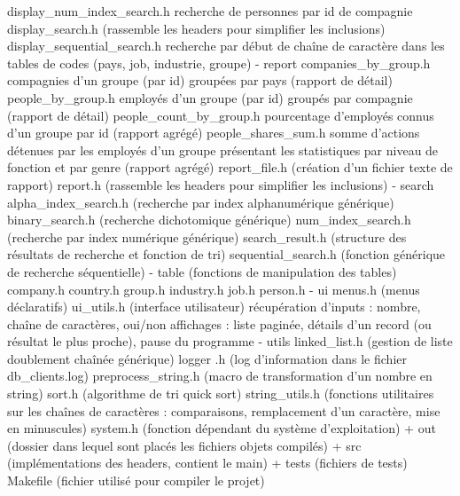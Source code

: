 \documentclass{article}
\begin{document}
\begin{verbatimtab}
            display_num_index_search.h
                recherche de personnes par id de compagnie
            display_search.h (rassemble les headers pour simplifier les inclusions)
            display_sequential_search.h
                recherche par début de chaîne de caractère dans les tables de codes
                (pays, job, industrie, groupe)
        - report
            companies_by_group.h
                compagnies d'un groupe (par id) groupées par pays (rapport de détail)
            people_by_group.h
                employés d'un groupe (par id) groupés par compagnie (rapport de détail)
            people_count_by_group.h 
                pourcentage d'employés connus d'un groupe par id (rapport agrégé)
            people_shares_sum.h
                somme d'actions détenues par les employés d'un groupe présentant
                les statistiques par niveau de fonction et par genre (rapport agrégé)
            report_file.h (création d'un fichier texte de rapport)
            report.h (rassemble les headers pour simplifier les inclusions)
        - search
            alpha_index_search.h (recherche par index alphanumérique générique)
            binary_search.h (recherche dichotomique générique)
            num_index_search.h (recherche par index numérique générique)
            search_result.h (structure des résultats de recherche et fonction de tri)
            sequential_search.h (fonction générique de recherche séquentielle)
        - table (fonctions de manipulation des tables)
            company.h
            country.h
            group.h
            industry.h
            job.h
            person.h
        - ui
            menus.h (menus déclaratifs)
            ui_utils.h (interface utilisateur)
                récupération d'inputs : nombre, chaîne de caractères, oui/non
                affichages : liste paginée, détails d'un record (ou résultat
                    le plus proche), pause du programme
        - utils
            linked_list.h (gestion de liste doublement chaînée générique)
            logger  .h (log d'information dans le fichier db_clients.log)
            preprocess_string.h (macro de transformation d'un nombre en string)
            sort.h (algorithme de tri quick sort)
            string_utils.h (fonctions utilitaires sur les chaînes de caractères :
                comparaisons, remplacement d'un caractère, mise en minuscules)
            system.h (fonction dépendant du système d'exploitation)
    + out (dossier dans lequel sont placés les fichiers objets compilés)
    + src (implémentations des headers, contient le main)
    + tests (fichiers de tests)
    Makefile (fichier utilisé pour compiler le projet)
    \end{verbatimtab}
\end{document}
